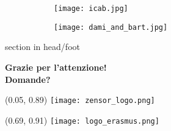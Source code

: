 \begin{frame}[plain]
    \vspace*{\fill}
    \begin{minipage}[c][0.63\paperheight]{\textwidth}
        \begin{figure}[ht]
            \begin{subfigure}{.495\textwidth}
                \centering
                \texttt{[image: icab.jpg]}
            \end{subfigure}
            \begin{subfigure}{.495\textwidth}
                \centering
                \texttt{[image: dami\_and\_bart.jpg]}
            \end{subfigure}
        \end{figure}
    \end{minipage}

    \begin{beamercolorbox}[wd        = \paperwidth,
            leftskip  = 1 em,
            rightskip = 1 em]
        {section in head/foot}

        \begin{minipage}[c][0.2\paperheight]{\textwidth}
            \centering 
            \bfseries{\Large Grazie per l'attenzione!} \\
            \vspace{1 em}
            \bfseries{\Large Domande?}
            
        \end{minipage}
    \end{beamercolorbox}

    \begin{minipage}[c][0.1\paperheight]{\textwidth}
    \end{minipage}

    \begin{textblock}{1}(0.05, 0.89)
        \texttt{[image: zensor\_logo.png]}
    \end{textblock}

    \begin{textblock}{1}(0.69, 0.91)
        \texttt{[image: logo\_erasmus.png]}
    \end{textblock}

    \vspace*{\fill}
\end{frame}